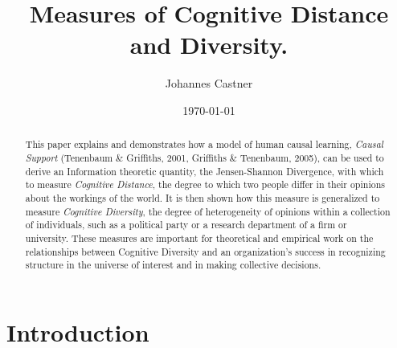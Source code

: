 \documentclass[12pt]{article}
\begin{document}
%

\title{Measures of Cognitive Distance and Diversity.}
\author{Johannes Castner}                %

\date \today
\maketitle

\begin{abstract}
This paper explains and demonstrates how a model of human causal learning, {\it Causal Support} (Tenenbaum \& Griffiths, 2001, Griffiths \& Tenenbaum, 2005), can be used to derive an Information theoretic quantity, the Jensen-Shannon Divergence, with which to measure {\it Cognitive Distance}, the degree to which two people differ in their opinions about the workings of the world. It is then shown how this measure is generalized to measure {\it Cognitive Diversity}, the degree of heterogeneity of opinions within a collection of individuals, such as a political party or a research department of a firm or university. These measures are important for theoretical and empirical work on the relationships between Cognitive Diversity and an organization's success in recognizing structure in the universe of interest and in making collective decisions.
\end{abstract}

\newpage

\section{Introduction}

\end{document}
